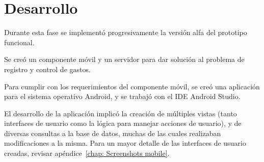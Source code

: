 \section{Desarrollo} \label{sect:desarrollo}

Durante esta fase se implementó progresivamente la versión alfa del prototipo funcional. 

Se creó un componente móvil y un servidor para dar solución al problema de registro y control de gastos.

Para cumplir con los requerimientos del componente móvil, se creó una aplicación para el sistema operativo Android, y se trabajó con el IDE Android Studio. 

El desarrollo de la aplicación implicó la creación de múltiples vistas (tanto interfaces de usuario como la lógica para manejar acciones de usuario), y de diversas consultas a la base de datos, muchas de las cuales realizaban modificaciones a la misma. Para un mayor detalle de las interfaces de usuario creadas, revisar apéndice~\ref{chap: Screenshots mobile}.

